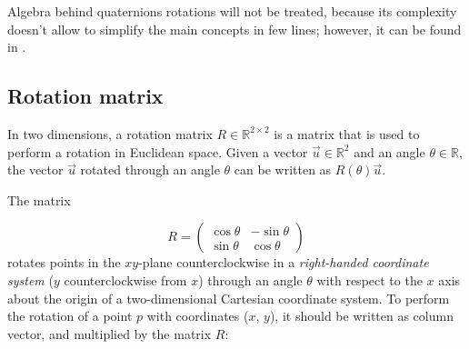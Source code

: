 Algebra behind quaternions rotations will not be treated, because its complexity doesn't allow to simplify the main concepts in few lines; however, it can be found in \cite[127-134]{Kui99}.

\subsection{Rotation matrix}
In two dimensions, a rotation matrix $R \in \mathbb R^{2 \times 2}$ is a matrix that is used to perform a rotation in Euclidean space. Given a vector $\vec u \in \mathbb R^2$ and an angle $\theta \in \mathbb R$, the vector $\vec u$ rotated through an angle $\theta$ can be written as $R(\theta) \vec u$.

The matrix

\[
	R =
	{\begin{pmatrix}
		\cos \theta & -\sin \theta \\
		\sin \theta & \cos \theta
	\end{pmatrix}}
\]
rotates points in the $xy$-plane counterclockwise in a \textit{right-handed coordinate system} ($y$ counterclockwise from $x$) through an angle $\theta$ with respect to the $x$ axis about the origin of a two-dimensional Cartesian coordinate system. To perform the rotation of a point $p$ with coordinates ($x$, $y$), it should be written as column vector, and multiplied by the matrix $R$:

